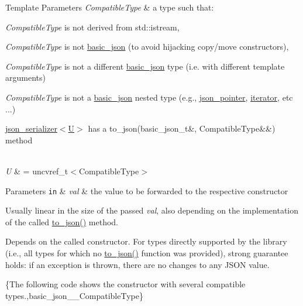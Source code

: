 \begin{DoxyTemplParams}{Template Parameters}
{\em Compatible\+Type} & a type such that\+:
\begin{DoxyItemize}
\item {\itshape Compatible\+Type} is not derived from {\ttfamily std\+::istream},
\item {\itshape Compatible\+Type} is not \hyperlink{classnlohmann_1_1basic__json}{basic\+\_\+json} (to avoid hijacking copy/move constructors),
\item {\itshape Compatible\+Type} is not a different \hyperlink{classnlohmann_1_1basic__json}{basic\+\_\+json} type (i.\+e. with different template arguments)
\item {\itshape Compatible\+Type} is not a \hyperlink{classnlohmann_1_1basic__json}{basic\+\_\+json} nested type (e.\+g., \hyperlink{classnlohmann_1_1json__pointer}{json\+\_\+pointer}, \hyperlink{classnlohmann_1_1basic__json_a099316232c76c034030a38faa6e34dca}{iterator}, etc ...)
\item \hyperlink{classnlohmann_1_1basic__json_a7768841baaaa7a21098a401c932efaff}{json\+\_\+serializer$<$\+U$>$} has a {\ttfamily to\+\_\+json(basic\+\_\+json\+\_\+t\&, Compatible\+Type\&\&)} method
\end{DoxyItemize}\\
\hline
{\em U} & = {\ttfamily uncvref\+\_\+t$<$Compatible\+Type$>$}\\
\hline
\end{DoxyTemplParams}

\begin{DoxyParams}[1]{Parameters}
\mbox{\tt in}  & {\em val} & the value to be forwarded to the respective constructor\\
\hline
\end{DoxyParams}
Usually linear in the size of the passed {\itshape val}, also depending on the implementation of the called {\ttfamily \hyperlink{namespacenlohmann_1_1anonymous__namespace_02to__json_8hpp_03_a3cf8d817622a3ecdd3dcce222deb7535}{to\+\_\+json()}} method.

Depends on the called constructor. For types directly supported by the library (i.\+e., all types for which no {\ttfamily \hyperlink{namespacenlohmann_1_1anonymous__namespace_02to__json_8hpp_03_a3cf8d817622a3ecdd3dcce222deb7535}{to\+\_\+json()}} function was provided), strong guarantee holds\+: if an exception is thrown, there are no changes to any J\+S\+ON value.

\{The following code shows the constructor with several compatible types.,basic\+\_\+json\+\_\+\+\_\+\+Compatible\+Type\}

